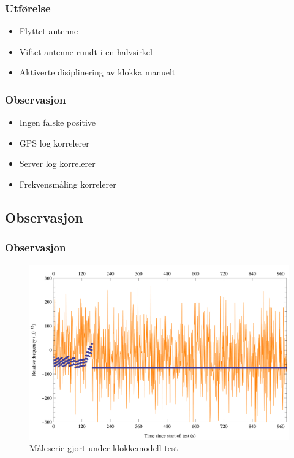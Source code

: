 \documentclass[xcolor=table]{beamer}
\begin{document}
\begin{frame}
\frametitle{Utførelse}
      \begin{itemize}
        \item Flyttet antenne 
        \item Viftet antenne rundt i en halvsirkel
        \item Aktiverte disiplinering av klokka manuelt
      \end{itemize}
\end{frame}

\begin{frame}
\frametitle{Observasjon}
      \begin{itemize}
        \item Ingen falske positive
        \item GPS log korrelerer
        \item Server log korrelerer
        \item Frekvensmåling korrelerer
      \end{itemize}
\end{frame}

\begin{frame}
\subsection{Observasjon}
\frametitle{Observasjon}
      \begin{figure}
        \includegraphics[scale=0.70]{thesis/graphics/20161024-test2-telemetry-and-cnt91-combined-1-2.png}
        \caption{Måleserie gjort under klokkemodell test}
      \end{figure}
\end{frame}
\end{document}
